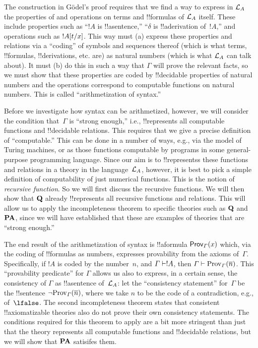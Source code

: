 \documentclass[../../../include/open-logic-section]{subfiles}
\begin{document}
The construction in G\"odel's proof requires that we find a way to
express in $\Lang L_A$ the properties of and operations on terms and
!!{formula}s of $\Lang L_A$ itself. These include properties such as
``$!A$ is !!a{sentence},'' ``$\delta$ is !!a{derivation} of~$!A$,''
and operations such as $!A[t/x]$.  This way must (a) express
these properties and relations via a ``coding'' of symbols and
sequences thereof (which is what terms, !!{formula}s, !!{derivation}s,
etc. are) as natural numbers (which is what $\Lang L_A$ can talk
about). It must (b) do this in such a way that $\Gamma$ will prove the
relevant facts, so we must show that these properties are coded by
!!{decidable} properties of natural numbers and the operations
correspond to computable functions on natural numbers. This is called
``arithmetization of syntax.''

Before we investigate how syntax can be arithmetized, however, we will
consider the condition that~$\Gamma$ is ``strong enough,'' i.e.,
!!{represents} all computable functions and !!{decidable} relations.
This requires that we give a precise definition of ``computable.''
This can be done in a number of ways, e.g., via the model of Turing
machines, or as those functions computable by programs in some
general-purpose programming language.  Since our aim is to
!!{represents}s these functions and relations in a theory in the
language~$\Lang L_A$, however, it is best to pick a simple definition
of computability of just numerical functions.  This is the notion of
\emph{recursive function}.  So we will first discuss the recursive
functions. We will then show that $\mathbf{Q}$ already !!{represents} all
recursive functions and relations.  This will allow us to apply the
incompleteness theorem to specific theories such as $\mathbf{Q}$ and
$\mathbf{PA}$, since we will have established that these are examples of
theories that are ``strong enough.''

The end result of the arithmetization of syntax is
!!a{formula} $\OProv[\Gamma](x)$ which, via the coding of !!{formula}s
as numbers, expresses provability from the axioms of~$\Gamma$.
Specifically, if $!A$ is coded by the number~$n$, and $\Gamma \Proves
!A$, then $\Gamma \Proves \Prov[\Gamma](\num{n})$.  This ``provability
predicate'' for $\Gamma$ allows us also to express, in a certain
sense, the consistency of $\Gamma$ as !!a{sentence} of~$\Lang L_A$:
let the ``consistency statement'' for~$\Gamma$ be the !!{sentence}
$\lnot \Prov[\Gamma](\num{n})$, where we take $n$ to be the code of a
contradiction, e.g., of~$\lfalse$.  The second incompleteness theorem
states that consistent !!{axiomatizable} theories also do not prove
their own consistency statements.  The conditions required for this
theorem to apply are a bit more stringent than just that the theory
represents all computable functions and !!{decidable} relations, but
we will show that $\mathbf{PA}$ satisifes them.
\end{document}
